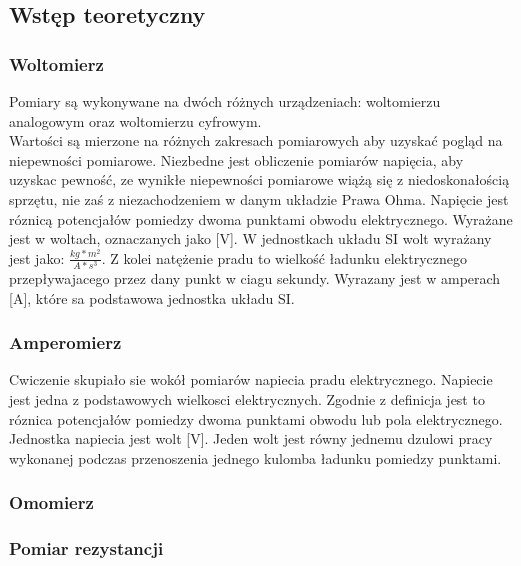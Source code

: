 \documentclass{extarticle}  %
\begin{document}
        \subsection{Wstęp teoretyczny}
            \subsubsection{Woltomierz}
                Pomiary są wykonywane na dwóch różnych urządzeniach: woltomierzu analogowym oraz woltomierzu cyfrowym.\\
                Wartości są mierzone na różnych zakresach pomiarowych aby uzyskać pogląd na niepewności pomiarowe.
                Niezbedne jest obliczenie pomiarów napięcia, aby uzyskac pewność, ze wynikłe niepewności pomiarowe wiążą się z niedoskonałością sprzętu,
                nie zaś z niezachodzeniem w danym układzie Prawa Ohma. 
                Napięcie jest róznicą potencjałów pomiedzy dwoma punktami obwodu elektrycznego. 
                Wyrażane jest w woltach, oznaczanych jako [V]. 
                W jednostkach układu SI wolt wyrażany jest jako: $\frac{kg \ast m^2}{A \ast s^3}$.
                Z kolei natężenie pradu to wielkość ładunku elektrycznego przepływajacego
                przez dany punkt w ciagu sekundy. Wyrazany jest w amperach [A], 
                które sa podstawowa jednostka układu SI.
                \subsubsection{Amperomierz}
                Cwiczenie skupiało sie wokół pomiarów napiecia pradu elektrycznego.
                Napiecie jest jedna z podstawowych wielkosci elektrycznych.
                Zgodnie z definicja jest to róznica potencjałów pomiedzy dwoma punktami obwodu lub pola elektrycznego. 
                Jednostka napiecia jest wolt [V]. 
                Jeden wolt jest równy jednemu dzulowi pracy wykonanej podczas przenoszenia jednego kulomba ładunku pomiedzy punktami.
            \subsubsection{Omomierz}

            \subsubsection{Pomiar rezystancji}
\end{document}
